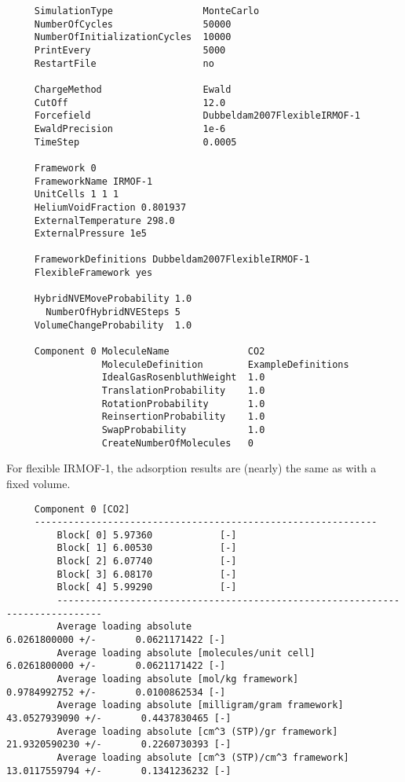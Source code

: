\begin{tiny}
\begin{verbatim}
     SimulationType                MonteCarlo
     NumberOfCycles                50000
     NumberOfInitializationCycles  10000
     PrintEvery                    5000
     RestartFile                   no

     ChargeMethod                  Ewald
     CutOff                        12.0
     Forcefield                    Dubbeldam2007FlexibleIRMOF-1
     EwaldPrecision                1e-6
     TimeStep                      0.0005

     Framework 0
     FrameworkName IRMOF-1
     UnitCells 1 1 1
     HeliumVoidFraction 0.801937
     ExternalTemperature 298.0
     ExternalPressure 1e5

     FrameworkDefinitions Dubbeldam2007FlexibleIRMOF-1
     FlexibleFramework yes

     HybridNVEMoveProbability 1.0
       NumberOfHybridNVESteps 5
     VolumeChangeProbability  1.0

     Component 0 MoleculeName              CO2
                 MoleculeDefinition        ExampleDefinitions
                 IdealGasRosenbluthWeight  1.0
                 TranslationProbability    1.0
                 RotationProbability       1.0
                 ReinsertionProbability    1.0
                 SwapProbability           1.0
                 CreateNumberOfMolecules   0
\end{verbatim}
\end{tiny}

\noindent
For flexible IRMOF-1, the adsorption results are (nearly) the same as with a fixed volume.
\begin{tiny}
\begin{verbatim}
     Component 0 [CO2]
     -------------------------------------------------------------
         Block[ 0] 5.97360            [-]
         Block[ 1] 6.00530            [-]
         Block[ 2] 6.07740            [-]
         Block[ 3] 6.08170            [-]
         Block[ 4] 5.99290            [-]
         ------------------------------------------------------------------------------
         Average loading absolute                              6.0261800000 +/-       0.0621171422 [-]
         Average loading absolute [molecules/unit cell]        6.0261800000 +/-       0.0621171422 [-]
         Average loading absolute [mol/kg framework]                  0.9784992752 +/-       0.0100862534 [-]
         Average loading absolute [milligram/gram framework]         43.0527939090 +/-       0.4437830465 [-]
         Average loading absolute [cm^3 (STP)/gr framework]          21.9320590230 +/-       0.2260730393 [-]
         Average loading absolute [cm^3 (STP)/cm^3 framework]        13.0117559794 +/-       0.1341236232 [-]
\end{verbatim}
\end{tiny}

